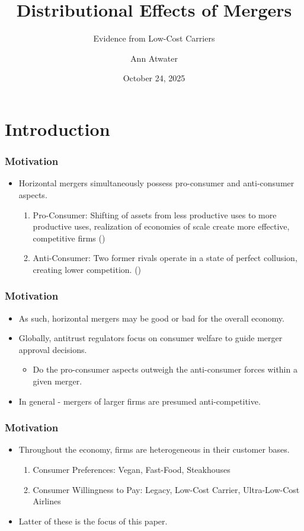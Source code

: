 \documentclass[xcolor=dvipsnames]{beamer}
\author{Ann Atwater}
\institute{University of Florida}
\title{Distributional Effects of Mergers}
\subtitle{Evidence from Low-Cost Carriers}
\date{October 24, 2025}
\begin{document}
	\section{Introduction}
	\frame{\titlepage}
    \begin{frame}
        \frametitle{Motivation}
        \begin{itemize}
            \item Horizontal mergers simultaneously possess pro-consumer and anti-consumer aspects.
            \begin{enumerate}
                \item Pro-Consumer: Shifting of assets from less productive uses to more productive uses, realization of economies of scale create more effective, competitive firms (\cite{williamson_economies_1968, farrell_horizontal_1990, kaplow_improving_2025})
                \item Anti-Consumer: Two former rivals operate in a state of perfect collusion, creating lower competition. (\cite{stigler_theory_1964})
            \end{enumerate}
        \end{itemize}
    \end{frame}

    \begin{frame}
        \frametitle{Motivation}
        \begin{itemize}
        \item As such, horizontal mergers may be good or bad for the overall economy.
            \item Globally, antitrust regulators focus on consumer welfare to guide merger approval decisions. 
            \begin{itemize}
                \item Do the pro-consumer aspects outweigh the anti-consumer forces within a given merger. 
        \end{itemize}
        \item In general - mergers of larger firms are presumed anti-competitive.
        \end{itemize}
    \end{frame}

    \begin{frame}
        \frametitle{Motivation}
        \begin{itemize}
            \item Throughout the economy, firms are heterogeneous in their customer bases.
            \begin{enumerate}
                \item Consumer Preferences: Vegan, Fast-Food, Steakhouses 
                \item Consumer Willingness to Pay: Legacy, Low-Cost Carrier, Ultra-Low-Cost Airlines
            \end{enumerate}
            \item Latter of these is the focus of this paper. 
        \end{itemize}
    \end{frame}
\end{document}
